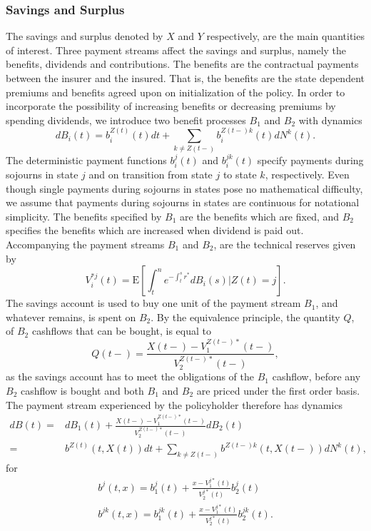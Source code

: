 \documentclass[12pt]{article}
\newcommand{\E}{\text{E}}
\theoremstyle{my_thm}
\begin{document}
\subsubsection{Savings and Surplus}
The savings and surplus denoted by $X$ and $Y$ respectively, are the main quantities of interest. Three payment streams affect the savings and surplus, namely the benefits, dividends and contributions. The benefits are the contractual payments between the insurer and the insured. That is, the benefits are the state dependent premiums and benefits agreed upon on initialization of the policy. In order to incorporate the possibility of increasing benefits or decreasing premiums by spending dividends, we introduce two benefit processes $B_1$ and $B_2$ with dynamics
$$
dB_i(t)=b_i^{Z(t)}(t) dt +\sum_{k \neq Z(t-)} b_i^{Z(t-)k}(t)dN^k(t).
$$
The deterministic payment functions $b_i^j(t)$ and $b_i^{jk}(t)$ specify payments during sojourns in state $j$ and on transition from state $j$ to state $k$, respectively. Even though single payments during sojourns in states pose no mathematical difficulty, we assume that payments during sojourns in states are continuous for notational simplicity. The benefits specified by $B_1$ are the benefits which are fixed, and $B_2$ specifies the benefits which are increased when dividend is paid out. Accompanying the payment streams $B_1$ and $B_2$, are the technical reserves given by
$$
V_i^{*j}(t)=\E \left[ \int_t^n e^{-\int_t^s r^*} dB_i(s) \big| Z(t)=j \right].
$$
The savings account is used to buy one unit of the payment stream $B_1$, and whatever remains, is spent on $B_2$. By the equivalence principle, the quantity $Q$, of $B_2$ cashflows that can be bought, is equal to
$$
Q(t-)=\frac{X(t-)-V_1^{Z(t-)*}(t-)}{V_2^{Z(t-)*}(t-)},
$$
as the savings account has to meet the obligations of the $B_1$ cashflow, before any $B_2$ cashflow is bought and both $B_1$ and $B_2$ are priced under the first order basis. The payment stream experienced by the policyholder therefore has dynamics
\begin{align*}
dB(t)=&dB_1(t)+\frac{X(t-)-V_1^{Z(t-)*}(t-)}{V_2^{Z(t-)*}(t-)}dB_2(t)
\\
=&b^{Z(t)}(t,X(t)) dt +\sum_{k \neq Z(t-)} b^{Z(t-)k}(t,X(t-))dN^k(t),
\end{align*}
for
\begin{gather*}
b^j(t,x)=b_1^j(t)+\frac{x-V_1^{j*}(t)}{V_2^{j*}(t)}b_2^j(t)
\\
b^{jk}(t,x)=b_1^{jk}(t)+\frac{x-V_1^{j*}(t)}{V_2^{j*}(t)}b_2^{jk}(t).
\end{gather*}
\end{document}
